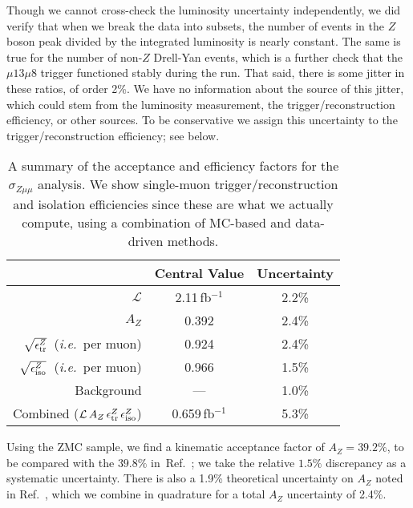 \documentclass[aps,prd,twocolumn,superscriptaddress,preprintnumbers,nofootinbib,longbibliography,floatfix]{revtex4-1}
\newcommand{\cL}{\mathcal{L}}
\newcommand{\inv}{$^{-1}$}
\DeclareRobustCommand{\Ref}[1]{Ref.~\cite{#1}}
\begin{document}
Though we cannot cross-check the luminosity uncertainty independently, we did verify that when we break the data into subsets, the number of events in the $Z$ boson peak divided by the integrated luminosity is nearly constant.  
%
The same is true for the number of non-$Z$ Drell-Yan events, which is a further check that the $\mu13\mu8$  trigger functioned stably during the run.
%
That said, there is some jitter in these ratios, of order 2\%.
%
We have no information about the source of this jitter, which could stem from the luminosity measurement, the trigger/reconstruction efficiency, or other sources.
%
To be conservative we assign this uncertainty to the trigger/reconstruction efficiency; see below.


\begin{table}[t!]
\centering
\begin{tabular}{ r @{$\quad$}  c @{$\quad$} c} 
 \hline \hline
 & Central Value & Uncertainty \\
 \hline
 $\cL$ & 2.11\,fb\inv & 2.2\% \\
 $A_Z$ & 0.392 & 2.4\% \\
 $\sqrt{\epsilon^Z_{\rm tr}}$\ ({\it i.e.}\ per muon) & 0.924 & 2.4\%\\
 $\sqrt{\epsilon^Z_{\rm iso}}$\ ({\it i.e.}\ per muon) & 0.966 & 1.5\%\\
 Background & --- & 1.0\% \\
 \hline
Combined ($\cL \, A_Z \, \epsilon^Z_{\rm tr} \, \epsilon^Z_{\rm iso}$) & 0.659\,fb\inv & 5.3\% \\
 \hline
 \hline
 \end{tabular}
\caption{
  A summary of the acceptance and efficiency factors for the $\sigma_{Z\mu\mu}$ analysis. We show single-muon trigger/reconstruction and isolation efficiencies since these are what we actually compute, using a combination of MC-based and  data-driven methods.}
\label{tab:AEff}
\end{table}


Using the ZMC sample, we find a kinematic acceptance factor of $A_Z = 39.2\%$, to be compared with the $39.8\%$ in~\Ref{CMS:2011aa}; we take the relative $1.5\%$ discrepancy as a systematic uncertainty.
%
There is also a 1.9\% theoretical uncertainty on $A_Z$ noted in \Ref{CMS:2011aa}, which we combine in quadrature for a total $A_Z$ uncertainty of 2.4\%.
\end{document}
